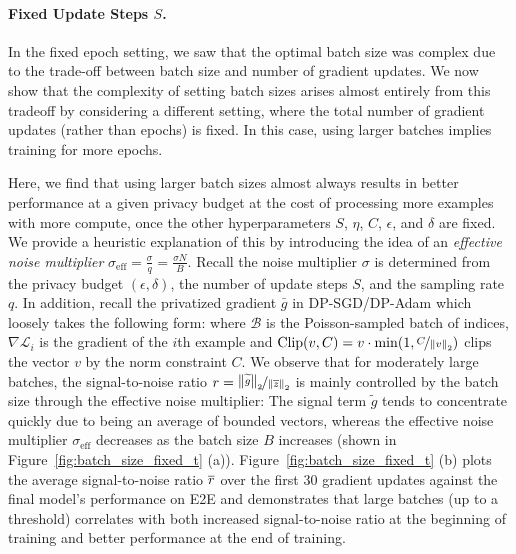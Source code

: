 \paragraph{Fixed Update Steps $S$.}
In the fixed epoch setting, we saw that the optimal batch size was complex due to the trade-off between batch size and number of gradient updates.
We now show that the complexity of setting batch sizes arises almost entirely from this tradeoff by considering a different setting, where the total number of gradient updates (rather than epochs) is fixed.
In this case, using larger batches implies training for more epochs.

Here, we find that using larger batch sizes almost always results in better performance at a given privacy budget at the cost of processing more examples with more compute, once the other hyperparameters $S$, $\eta$, $C$, $\epsilon$, and $\delta$ are fixed.
We provide a heuristic explanation of this by introducing the idea of an \textit{effective noise multiplier} $\sigma_{\text{eff}} = \tfrac{\sigma}{q} = \tfrac{\sigma N} {B}$.  
Recall the noise multiplier $\sigma$ is determined from the privacy budget $(\epsilon, \delta)$, the number of update steps $S$, and the sampling rate $q$. 
In addition, recall the privatized gradient $\bar{g}$ in DP-SGD/DP-Adam which loosely takes the following form:
where $\mathcal{B}$ is the Poisson-sampled batch of indices, $\nabla \mathcal{L}_i$ is the gradient of the $i$th example and $\text{Clip}(v, C) = v \cdot \min(1, \nicefrac{C}{\left\lVert v\right\rVert_2} )$ clips the vector $v$ by the norm constraint $C$. 
We observe that for moderately large batches, the signal-to-noise ratio 
$r = \nicefrac{\left\lVert\widetilde{g}\right\rVert_2}{\left\lVert\mathop{\overline{z}}\right\rVert_2}$ is mainly controlled by the batch size through the effective noise multiplier: 
The signal term $\widetilde{g}$ tends to concentrate quickly due to being an average of bounded vectors, whereas the effective noise multiplier $\sigma_{\text{eff}}$ decreases as the batch size $B$ increases (shown in Figure~\ref{fig:batch_size_fixed_t} (a)).
Figure~\ref{fig:batch_size_fixed_t} (b) plots the average signal-to-noise ratio $\mathop{\overline{r}}$ over the first 30 gradient updates against the final model's performance on E2E and demonstrates that large batches (up to a threshold) correlates with both increased signal-to-noise ratio at the beginning of training and better performance at the end of training.

